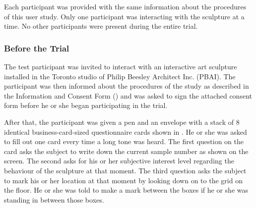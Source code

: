Each participant was provided with the same information about the procedures of this user study. Only one participant was interacting with the sculpture at a time. No other participants were present during the entire trial. 

\subsubsection{Before the Trial}

The test participant was invited to interact with an interactive art sculpture installed in the Toronto studio of Philip Beesley Architect Inc. (PBAI). The participant was then informed about the procedures of the study as described in the Information and Consent Form () and was asked to sign the attached consent form before he or she began participating in the trial. 

After that, the participant was given a pen and an envelope with a stack of 8 identical business-card-sized questionnaire cards shown in . He or she was asked to fill out one card every time a long tone was heard. The first question on the card asks the subject to write down the current sample number as shown on the screen. The second asks for his or her subjective interest level regarding the behaviour of the sculpture at that moment. The third question asks the subject to mark his or her location at that moment by looking down on to the grid on the floor. He or she was told to make a mark between the boxes if he or she was standing in between those boxes. 

